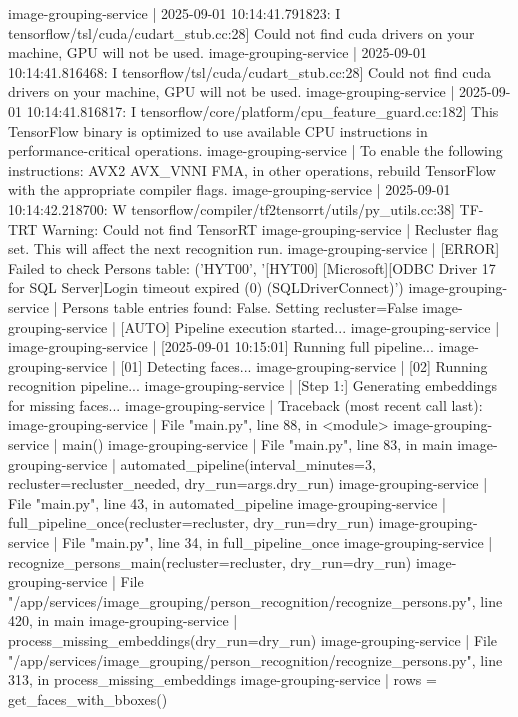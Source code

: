 image-grouping-service  | 2025-09-01 10:14:41.791823: I tensorflow/tsl/cuda/cudart_stub.cc:28] Could not find cuda drivers on your machine, GPU will not be used.
image-grouping-service  | 2025-09-01 10:14:41.816468: I tensorflow/tsl/cuda/cudart_stub.cc:28] Could not find cuda drivers on your machine, GPU will not be used.
image-grouping-service  | 2025-09-01 10:14:41.816817: I tensorflow/core/platform/cpu_feature_guard.cc:182] This TensorFlow binary is optimized to use available CPU instructions in performance-critical operations.
image-grouping-service  | To enable the following instructions: AVX2 AVX_VNNI FMA, in other operations, rebuild TensorFlow with the appropriate compiler flags.
image-grouping-service  | 2025-09-01 10:14:42.218700: W tensorflow/compiler/tf2tensorrt/utils/py_utils.cc:38] TF-TRT Warning: Could not find TensorRT
image-grouping-service  | Recluster flag set. This will affect the next recognition run.
image-grouping-service  | [ERROR] Failed to check Persons table: ('HYT00', '[HYT00] [Microsoft][ODBC Driver 17 for SQL Server]Login timeout expired (0) (SQLDriverConnect)')
image-grouping-service  | Persons table entries found: False. Setting recluster=False
image-grouping-service  | [AUTO] Pipeline execution started...
image-grouping-service  |
image-grouping-service  | [2025-09-01 10:15:01] Running full pipeline...
image-grouping-service  | [01] Detecting faces...
image-grouping-service  | [02] Running recognition pipeline...
image-grouping-service  | [Step 1:] Generating embeddings for missing faces...
image-grouping-service  | Traceback (most recent call last):
image-grouping-service  |   File "main.py", line 88, in <module>
image-grouping-service  |     main()
image-grouping-service  |   File "main.py", line 83, in main
image-grouping-service  |     automated_pipeline(interval_minutes=3, recluster=recluster_needed, dry_run=args.dry_run)
image-grouping-service  |   File "main.py", line 43, in automated_pipeline
image-grouping-service  |     full_pipeline_once(recluster=recluster, dry_run=dry_run)
image-grouping-service  |   File "main.py", line 34, in full_pipeline_once
image-grouping-service  |     recognize_persons_main(recluster=recluster, dry_run=dry_run)
image-grouping-service  |   File "/app/services/image_grouping/person_recognition/recognize_persons.py", line 420, in main
image-grouping-service  |     process_missing_embeddings(dry_run=dry_run)
image-grouping-service  |   File "/app/services/image_grouping/person_recognition/recognize_persons.py", line 313, in process_missing_embeddings
image-grouping-service  |     rows = get_faces_with_bboxes()
